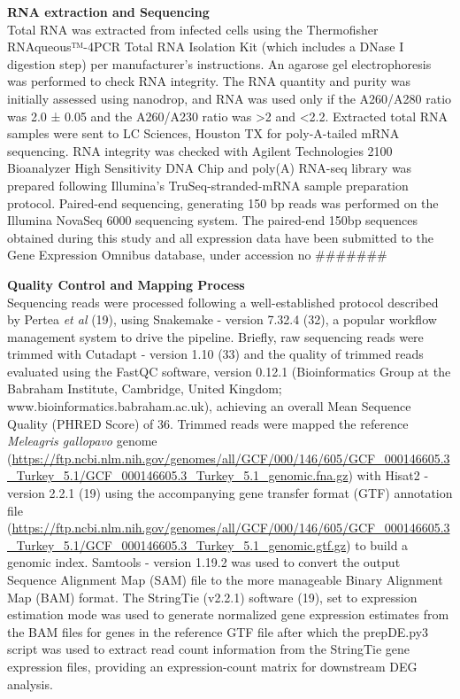\documentclass[
]{article}
\begin{document}
\textbf{RNA extraction and Sequencing}\\
Total RNA was extracted from infected cells using the Thermofisher
RNAqueous™-4PCR Total RNA Isolation Kit (which includes a DNase I
digestion step) per manufacturer's instructions. An agarose gel
electrophoresis was performed to check RNA integrity. The RNA quantity
and purity was initially assessed using nanodrop, and RNA was used only
if the A260/A280 ratio was 2.0 ± 0.05 and the A260/A230 ratio was
\textgreater2 and \textless2.2. Extracted total RNA samples were sent to
LC Sciences, Houston TX for poly-A-tailed mRNA sequencing. RNA integrity
was checked with Agilent Technologies 2100 Bioanalyzer High Sensitivity
DNA Chip and poly(A) RNA-seq library was prepared following Illumina's
TruSeq-stranded-mRNA sample preparation protocol. Paired-end sequencing,
generating 150 bp reads was performed on the Illumina NovaSeq 6000
sequencing system. The paired-end 150bp sequences obtained during this
study and all expression data have been submitted to the Gene Expression
Omnibus database, under accession no \#\#\#\#\#\#\#

\textbf{Quality Control and Mapping Process}\\
Sequencing reads were processed following a well-established protocol
described by Pertea \emph{et al} (19), using Snakemake - version 7.32.4
(32), a popular workflow management system to drive the pipeline.
Briefly, raw sequencing reads were trimmed with Cutadapt - version 1.10
(33) and the quality of trimmed reads evaluated using the FastQC
software, version 0.12.1 (Bioinformatics Group at the Babraham
Institute, Cambridge, United Kingdom;
www.bioinformatics.babraham.ac.uk), achieving an overall Mean Sequence
Quality (PHRED Score) of 36. Trimmed reads were mapped the reference
\emph{Meleagris gallopavo} genome
(\url{https://ftp.ncbi.nlm.nih.gov/genomes/all/GCF/000/146/605/GCF_000146605.3_Turkey_5.1/GCF_000146605.3_Turkey_5.1_genomic.fna.gz})
with Hisat2 - version 2.2.1 (19) using the accompanying gene transfer
format (GTF) annotation file
(\url{https://ftp.ncbi.nlm.nih.gov/genomes/all/GCF/000/146/605/GCF_000146605.3_Turkey_5.1/GCF_000146605.3_Turkey_5.1_genomic.gtf.gz})
to build a genomic index. Samtools - version 1.19.2 was used to convert
the output Sequence Alignment Map (SAM) file to the more manageable
Binary Alignment Map (BAM) format. The StringTie (v2.2.1) software (19),
set to expression estimation mode was used to generate normalized gene
expression estimates from the BAM files for genes in the reference GTF
file after which the prepDE.py3 script was used to extract read count
information from the StringTie gene expression files, providing an
expression-count matrix for downstream DEG analysis.
\end{document}
